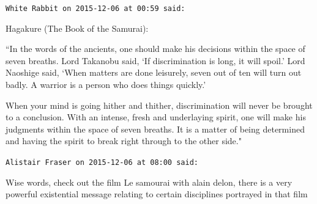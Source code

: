 \begin{footnotesize}
\begin{sffamily}
\hfill

\texttt{White Rabbit on 2015-12-06 at 00:59 said: }

Hagakure (The Book of the Samurai): 

``In the words of the ancients, one should make his decisions within the space of seven breaths. Lord Takanobu said, `If discrimination is long, it will spoil.' Lord Naoshige said, `When matters are done leisurely, seven out of ten will turn out badly. A warrior is a person who does things quickly.'

When your mind is going hither and thither, discrimination will never be brought to a conclusion. With an intense, fresh and underlaying spirit, one will make his judgments within the space of seven breaths. It is a matter of being determined and having the spirit to break right through to the other side."


\hfill

\texttt{Alistair Fraser on 2015-12-06 at 08:00 said: }

Wise words, check out the film Le samourai with alain delon, there is a very powerful existential message relating to certain disciplines portrayed in that film


\end{sffamily}\end{footnotesize}

